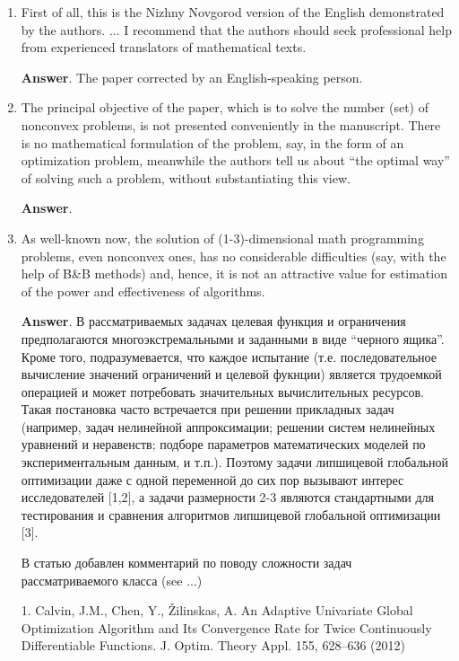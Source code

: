 \documentclass{article}%
\begin{document}
\begin{enumerate}
\item 
First of all, this is the Nizhny Novgorod version of the English demonstrated by the authors. ... I recommend that the authors should seek professional help from experienced translators of mathematical texts. 

\textbf{Answer}. 
The paper corrected by an English-speaking person.

\item The principal objective of the paper, which is to solve the number (set) of nonconvex problems, is not presented conveniently in the manuscript. There is no mathematical formulation of the problem, say, in the form of an optimization problem, meanwhile the authors tell us about “the optimal way” of solving such a problem, without substantiating this view.

\textbf{Answer}.

\item As well-known now, the solution of (1-3)-dimensional math programming problems, even nonconvex ones, has no considerable difficulties (say, with the help of B\&B methods) and, hence, it is not an attractive value for estimation of the power and effectiveness of algorithms.

\textbf{Answer}.
В рассматриваемых задачах целевая функция и ограничения предполагаются многоэкстремальными и заданными в виде ``черного ящика''. Кроме того, подразумевается, что каждое испытание (т.е. последовательное вычисление значений ограничений и целевой фукнции) является трудоемкой операцией и может потребовать значительных вычислительных ресурсов. Такая постановка часто встречается при решении прикладных задач (например, задач нелинейной аппроксимации; решении систем нелинейных уравнений и неравенств; подборе параметров математических моделей по экспериментальным данным, и т.п.). Поэтому задачи липшицевой глобальной оптимизации даже с одной переменной до сих пор вызывают интерес исследователей [1,2], а задачи размерности 2-3 являются стандартными для тестирования и сравнения алгоритмов липшицевой глобальной оптимизации [3].

В статью добавлен комментарий по поводу сложности задач рассматриваемого класса (see ...)

1. Calvin, J.M., Chen, Y., {\v Z}ilinskas, A. An Adaptive Univariate Global Optimization Algorithm and Its Convergence Rate for Twice Continuously Differentiable Functions. J. Optim. Theory Appl. 155, 628–636 (2012)


\end{enumerate}
\end{document}
